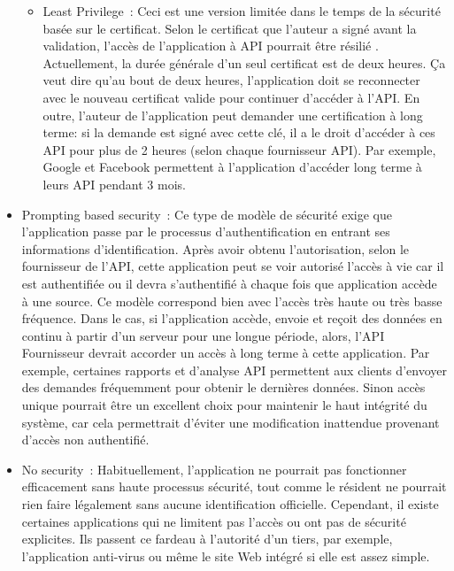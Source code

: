 \begin{itemize}
\begin{itemize}
 \item Least Privilege : Ceci est une version limitée dans le temps de  la sécurité basée sur le certificat. Selon le certificat que l'auteur  a signé avant la validation, l’accès de l'application à API pourrait être résilié \cite{11}. Actuellement, la durée générale d'un seul certificat est de deux heures. Ça veut dire qu'au bout de deux heures, l'application doit se reconnecter avec le nouveau certificat valide pour continuer d’accéder à l'API. En outre, l'auteur de l'application peut demander une certification à long terme: si la demande est signé avec cette clé, il a le droit d'accéder à ces API pour plus de 2 heures (selon chaque fournisseur API). Par exemple, Google et Facebook permettent à l'application d'accéder long terme à leurs API pendant 3 mois.
 \end{itemize}
 \item Prompting based security : Ce type de modèle de sécurité exige que l'application passe par le processus d'authentification en entrant ses informations d'identification. Après avoir obtenu l'autorisation, selon le fournisseur de l'API, cette application peut se voir autorisé l’accès à vie car il est authentifiée ou il devra s'authentifié à chaque fois que application accède à une source\cite{12}. Ce modèle correspond bien avec l'accès très haute ou très basse fréquence. Dans le cas, si l'application accède, envoie et reçoit des données en continu à partir d'un serveur pour une longue période, alors, l'API Fournisseur devrait accorder un accès à long terme à cette application. Par exemple, certaines rapports et d'analyse API permettent aux clients d'envoyer des demandes fréquemment pour obtenir le dernières données. Sinon accès unique pourrait être un excellent choix pour maintenir le haut intégrité du système, car cela permettrait d'éviter une modification inattendue provenant  d'accès non authentifié.
 \item No security : Habituellement, l'application ne pourrait pas fonctionner efficacement sans haute processus  sécurité, tout comme le résident ne pourrait rien faire légalement sans aucune identification officielle. Cependant, il existe certaines applications qui ne limitent pas l'accès ou ont pas de sécurité explicites. Ils passent ce fardeau à l'autorité d'un tiers, par exemple, l'application anti-virus ou même le site Web intégré si elle est assez simple.
 \end{itemize}

